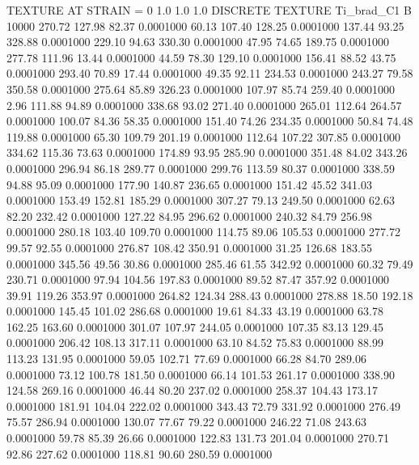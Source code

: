 TEXTURE AT STRAIN = 0
1.0   1.0   1.0
DISCRETE TEXTURE Ti_brad_C1
B 10000
 270.72  127.98   82.37   0.0001000
  60.13  107.40  128.25   0.0001000
 137.44   93.25  328.88   0.0001000
 229.10   94.63  330.30   0.0001000
  47.95   74.65  189.75   0.0001000
 277.78  111.96   13.44   0.0001000
  44.59   78.30  129.10   0.0001000
 156.41   88.52   43.75   0.0001000
 293.40   70.89   17.44   0.0001000
  49.35   92.11  234.53   0.0001000
 243.27   79.58  350.58   0.0001000
 275.64   85.89  326.23   0.0001000
 107.97   85.74  259.40   0.0001000
   2.96  111.88   94.89   0.0001000
 338.68   93.02  271.40   0.0001000
 265.01  112.64  264.57   0.0001000
 100.07   84.36   58.35   0.0001000
 151.40   74.26  234.35   0.0001000
  50.84   74.48  119.88   0.0001000
  65.30  109.79  201.19   0.0001000
 112.64  107.22  307.85   0.0001000
 334.62  115.36   73.63   0.0001000
 174.89   93.95  285.90   0.0001000
 351.48   84.02  343.26   0.0001000
 296.94   86.18  289.77   0.0001000
 299.76  113.59   80.37   0.0001000
 338.59   94.88   95.09   0.0001000
 177.90  140.87  236.65   0.0001000
 151.42   45.52  341.03   0.0001000
 153.49  152.81  185.29   0.0001000
 307.27   79.13  249.50   0.0001000
  62.63   82.20  232.42   0.0001000
 127.22   84.95  296.62   0.0001000
 240.32   84.79  256.98   0.0001000
 280.18  103.40  109.70   0.0001000
 114.75   89.06  105.53   0.0001000
 277.72   99.57   92.55   0.0001000
 276.87  108.42  350.91   0.0001000
  31.25  126.68  183.55   0.0001000
 345.56   49.56   30.86   0.0001000
 285.46   61.55  342.92   0.0001000
  60.32   79.49  230.71   0.0001000
  97.94  104.56  197.83   0.0001000
  89.52   87.47  357.92   0.0001000
  39.91  119.26  353.97   0.0001000
 264.82  124.34  288.43   0.0001000
 278.88   18.50  192.18   0.0001000
 145.45  101.02  286.68   0.0001000
  19.61   84.33   43.19   0.0001000
  63.78  162.25  163.60   0.0001000
 301.07  107.97  244.05   0.0001000
 107.35   83.13  129.45   0.0001000
 206.42  108.13  317.11   0.0001000
  63.10   84.52   75.83   0.0001000
  88.99  113.23  131.95   0.0001000
  59.05  102.71   77.69   0.0001000
  66.28   84.70  289.06   0.0001000
  73.12  100.78  181.50   0.0001000
  66.14  101.53  261.17   0.0001000
 338.90  124.58  269.16   0.0001000
  46.44   80.20  237.02   0.0001000
 258.37  104.43  173.17   0.0001000
 181.91  104.04  222.02   0.0001000
 343.43   72.79  331.92   0.0001000
 276.49   75.57  286.94   0.0001000
 130.07   77.67   79.22   0.0001000
 246.22   71.08  243.63   0.0001000
  59.78   85.39   26.66   0.0001000
 122.83  131.73  201.04   0.0001000
 270.71   92.86  227.62   0.0001000
 118.81   90.60  280.59   0.0001000
